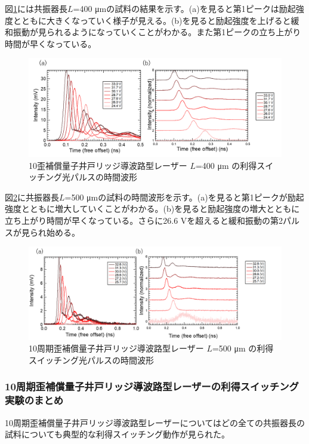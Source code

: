 {図\ref{fig:fig_3_2_10QW_ridge_L400_GS}には共振器長$L$=400 \si{\micro\metre}の試料の結果を示す。(a)を見ると第1ピークは励起強度とともに大きくなっていく様子が見える。(b)を見ると励起強度を上げると緩和振動が見られるようになっていくことがわかる。また第1ピークの立ち上がり時間が早くなっている。
\begin{figure}[h]
	\centering
	\includegraphics[width=15cm]{figure/fig_3_2_10QW_ridge_L400_GS.png}
		\caption{10歪補償量子井戸リッジ導波路型レーザー $L$=400 \si{\micro\metre} の利得スイッチング光パルスの時間波形}
		\label{fig:fig_3_2_10QW_ridge_L400_GS}
\end{figure}

図\ref{fig:fig_3_2_10QW_ridge_L500_GS}に共振器長$L$=500 \si{\micro\metre}の試料の時間波形を示す。(a)を見ると第1ピークが励起強度とともに増大していくことがわかる。(b)を見ると励起強度の増大とともに立ち上がり時間が早くなっている。さらに26.6 Vを超えると緩和振動の第2パルスが見られ始める。
\begin{figure}[h]
	\centering
	\includegraphics[width=15cm]{figure/fig_3_2_10QW_ridge_L500_GS.png}
		\caption{10周期歪補償量子井戸リッジ導波路型レーザー $L$=500 \si{\micro\metre} の利得スイッチング光パルスの時間波形}
		\label{fig:fig_3_2_10QW_ridge_L500_GS}
\end{figure}

\newpage
\subsubsection{10周期歪補償量子井戸リッジ導波路型レーザーの利得スイッチング実験のまとめ}
10周期歪補償量子井戸リッジ導波路型レーザーについてはどの全ての共振器長の試料についても典型的な利得スイッチング動作が見られた。


}
